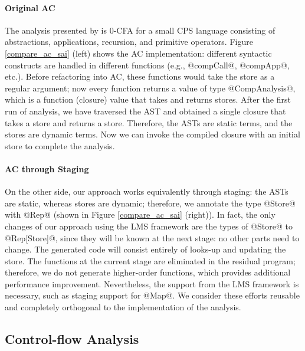 \paragraph{Original AC}
The analysis presented by \citeauthor{Boucher:1996:ACN:647473.727587} is 0-CFA
for a small CPS language consisting of abstractions, applications, recursion, and
primitive operators. Figure \ref{compare_ac_sai} (left) shows the AC
implementation: different syntactic constructs are handled in different functions
(e.g., @compCall@, @compApp@, etc.).
Before refactoring into AC, these functions would take the store as a
regular argument; now every function returns a value of type @CompAnalysis@,
which is a function (closure) value that takes and returns stores. After the
first run of analysis, we have traversed the AST and obtained a single closure that
takes a store and returns a store. Therefore, the ASTs are static terms, and the
stores are dynamic terms. Now we can invoke the compiled closure with an initial
store to complete the analysis.

\paragraph{AC through Staging}

On the other side, our approach works equivalently through staging: the
ASTs are static, whereas stores are dynamic; therefore, we annotate the type @Store@
with @Rep@ (shown in Figure \ref{compare_ac_sai} (right)). In fact, the only
changes of our approach using the LMS framework are the types of @Store@ to
@Rep[Store]@, since they will be known at the next stage: no other parts need to change.
The generated code
will consist entirely of looks-up and updating the store. The functions at the current stage are
eliminated in the residual program; therefore, we do not generate higher-order
functions, which provides additional performance improvement. Nevertheless,
the support from the LMS framework is necessary, such as staging support for @Map@.
We consider these efforts reusable and completely orthogonal to the
implementation of the analysis.

\subsection{Control-flow Analysis} \label{cfa}

